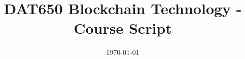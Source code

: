 \documentclass[a4paper,11pt,draft]{report}
\begin{document}
	\title{DAT650 Blockchain Technology - Course Script}
	\date{\today}
	
	\maketitle
	


\end{document}
